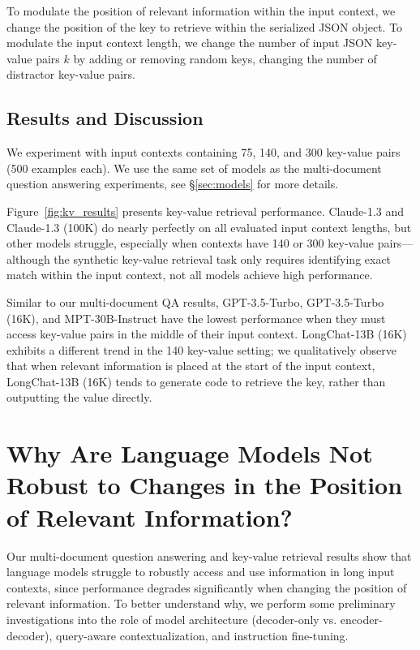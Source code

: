 \documentclass[11pt,a4paper]{article}
\newcommand{\mptinstruct}[0]{MPT-30B-Instruct\xspace}
\newcommand{\longchat}[0]{LongChat-13B (16K)\xspace}
\newcommand{\gptturbo}[0]{GPT-3.5-Turbo\xspace}
\newcommand{\gptturboextended}[0]{GPT-3.5-Turbo (16K)\xspace}
\newcommand{\claude}[0]{Claude-1.3\xspace}
\newcommand{\claudeextended}[0]{Claude-1.3 (100K)\xspace}
\begin{document}
To modulate the position of relevant information within the input context, we change the position of the key to retrieve within the serialized JSON object.
To modulate the input context length, we change the number of input JSON key-value pairs $k$ by adding or removing random keys, changing the number of distractor key-value pairs.


\subsection{Results and Discussion}\label{sec:kv_results}

We experiment with input contexts containing 75, 140, and 300 key-value pairs (500 examples each). We use the same set of models as the multi-document question answering experiments, see \S\ref{sec:models} for more details.

Figure~\ref{fig:kv_results} presents key-value retrieval performance. \claude{} and \claudeextended{} do nearly perfectly on all evaluated input context lengths, but other models struggle, especially when contexts have 140 or 300 key-value pairs---although the synthetic key-value retrieval task only requires identifying exact match within the input context, not all models achieve high performance.

Similar to our multi-document QA results, \gptturbo{}, \gptturboextended{}, and \mptinstruct{} have the lowest performance when they must access key-value pairs in the middle of their input context.
\longchat exhibits a different trend in the 140 key-value setting; we qualitatively observe that when relevant information is placed at the start of the input context, \longchat tends to generate code to retrieve the key, rather than outputting the value directly.

\section{Why Are Language Models Not Robust to Changes in the Position of Relevant Information?}\label{sec:why_u_shape}

Our multi-document question answering and key-value retrieval results show that language models struggle to robustly access and use information in long input contexts, since performance degrades significantly when changing the position of relevant information. To better understand why, we perform some preliminary investigations into the role of model architecture (decoder-only vs. encoder-decoder), query-aware contextualization, and instruction fine-tuning.
\end{document}
